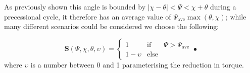 \documentclass[11pt]{article}
\numberwithin{equation}{section}
\numberwithin{figure}{section}
\numberwithin{table}{section}
\begin{document}
As previously shown this angle is bounded by $|\chi - \theta| < \Psi
< \chi + \theta$ during a precessional cycle, it therefore has an average
value of $\Psi_{\textrm{ave}}\max(\theta, \chi)$; while many different
scenarios could be considered we choose the following: 

\begin{equation}
\boldsymbol{S}(\Psi, \chi, \theta, \upsilon) = \left\{
\begin{array}{ccc}
1 & \textrm{if} & \Psi > \Psi_{\textrm{ave}} \\
1 - \upsilon & \textrm{else} & 
\end{array}•\right. 
\end{equation}
where $\upsilon$ is a number between 0 and 1 parameterising the reduction in torque. 
%
%
%
%
%
\end{document}
